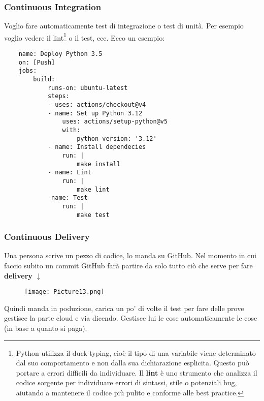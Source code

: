 \documentclass[a4paper,12pt]{article}
\begin{document}
\subsubsection{Continuous Integration}
Voglio fare automaticamente test di integrazione o test di unità. Per esempio voglio vedere il lint\footnote{Python utilizza il duck-typing, cioè il tipo di una variabile viene determinato dal suo comportamento e non dalla sua dichiarazione esplicita. Questo può portare a errori difficili da individuare. Il \textbf{lint} è uno strumento che analizza il codice sorgente per individuare errori di sintassi, stile o potenziali bug, aiutando a mantenere il codice più pulito e conforme alle best practice.}
o il test, ecc.
Ecco un esempio:
\begin{lstlisting}
    name: Deploy Python 3.5
    on: [Push]
    jobs:
        build:
            runs-on: ubuntu-latest
            steps:
            - uses: actions/checkout@v4
            - name: Set up Python 3.12
                uses: actions/setup-python@v5
                with:
                    python-version: '3.12'
            - name: Install dependecies
                run: |
                    make install
            - name: Lint
                run: |
                    make lint
            -name: Test
                run: |
                    make test
\end{lstlisting}
\newpage
\subsubsection{Continuous Delivery}
Una persona scrive un pezzo di codice, lo manda su GitHub. Nel momento in cui faccio subito un commit GitHub farà partire da solo tutto ciò che serve per fare \textbf{delivery} $\downarrow $
\begin{figure}[H]
  \centering
  \texttt{[image: Picture13.png]}
  \label{etichetta13}
\end{figure}
\noindent Quindi manda in poduzione, carica un po' di volte il test per fare delle prove gestisce la parte cloud e via dicendo. Gestisce lui le cose automaticamente le cose (in base a quanto si paga).
\end{document}
